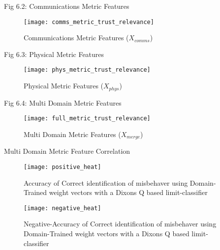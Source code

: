 \documentclass[aspectratio=169]{beamer}
\begin{document}
\begin{frame}{Fig 6.2: Communications Metric Features}

\begin{figure}[h!]
	\centering

	\texttt{[image: comms\_metric\_trust\_relevance]}
	\caption{Communications Metric Features ($X_{comms}$)}
	\label{fig:comms_feature_extraction}
\end{figure}
\end{frame}
\begin{frame}{Fig 6.3: Physical Metric Features}
	
\begin{figure}[h!]
	\centering
	\texttt{[image: phys\_metric\_trust\_relevance]}
	\caption{Physical Metric Features ($X_{phys}$)}
	\label{fig:phys_feature_extraction}
\end{figure}
\end{frame}
\begin{frame}{Fig 6.4: Multi Domain  Metric Features}
	
\begin{figure}[h!]
	\centering
	\texttt{[image: full\_metric\_trust\_relevance]}
	\caption{Multi Domain  Metric Features ($X_{merge}$)}
	\label{fig:multi_feature_extraction}
\end{figure}
\end{frame}
\begin{frame}{Multi Domain Metric Feature Correlation}
	
\begin{table}
	\centering
	\caption{Multi Domain Metric Feature Correlation ($X_{merge}$)}
	
	\label{tab:full_metric_correlations}
\end{table}
\end{frame}

\begin{frame}
	\begin{figure}
		\centering
		\texttt{[image: positive\_heat]}
		\caption{Accuracy of Correct identification of misbehaver using Domain-Trained weight vectors with a Dixons Q based limit-classifier}
		\label{fig:positive_heat}
	\end{figure}
\end{frame}
\begin{frame}
	\begin{figure}
		\centering
		\texttt{[image: negative\_heat]}
		\caption{Negative-Accuracy of Correct identification of misbehaver using Domain-Trained weight vectors with a Dixons Q based limit-classifier}
		\label{fig:negative_heat}
	\end{figure}
\end{frame}
\end{document}
